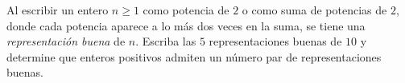 Al escribir un entero $n\ge1$ como potencia de $2$ o como suma de potencias de $2$, donde cada potencia aparece a lo más dos veces en la suma, se tiene una \emph{representación buena} de $n$. Escriba las $5$ representaciones buenas de $10$ y determine que enteros positivos admiten un número par de representaciones buenas.
